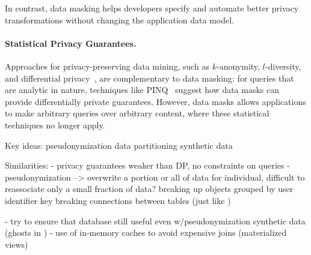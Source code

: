In contrast, data masking helps developers specify and automate better privacy transformations
without changing the application data model.



\paragraph{Statistical Privacy Guarantees.}
Approaches for privacy-preserving data mining, such as $k$-anonymity, $l$-diversity, and
differential privacy~\cite{dataminingmodels}, are complementary to data masking: for queries that
are analytic in nature, techniques like PINQ~\cite{pinq} suggest how data masks can provide
differentially private guarantees. However, data masks allows applications to make arbitrary queries
over arbitrary content, where these statistical techniques no longer apply. 

\iffalse
Key ideas:
    pseudonymization 
    data partitioning
    synthetic data

Similarities:
- privacy guarantees weaker than DP, no constraints on queries
- pseudonymization --> overwrite a portion or all of data for individual, difficult to reassociate
    only a small fraction of data?
    breaking up objects grouped by user identifier key
    breaking connections between tables (just like )

- try to ensure that database still useful even w/pseudonymization
    synthetic data (ghosts in \name) 
- use of in-memory caches to avoid expensive joins (materialized views)

